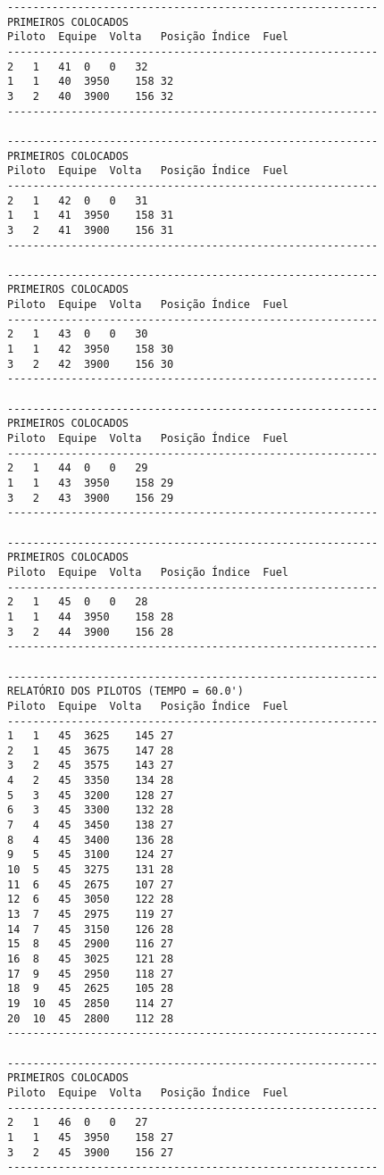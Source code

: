 \documentclass[12pt]{article}
\begin{document}
\begin{verbatim}
----------------------------------------------------------
PRIMEIROS COLOCADOS
Piloto	Equipe	Volta	Posição	Índice	Fuel
----------------------------------------------------------
2	1	41	0	0	32
1	1	40	3950	158	32
3	2	40	3900	156	32
----------------------------------------------------------

----------------------------------------------------------
PRIMEIROS COLOCADOS
Piloto	Equipe	Volta	Posição	Índice	Fuel
----------------------------------------------------------
2	1	42	0	0	31
1	1	41	3950	158	31
3	2	41	3900	156	31
----------------------------------------------------------

----------------------------------------------------------
PRIMEIROS COLOCADOS
Piloto	Equipe	Volta	Posição	Índice	Fuel
----------------------------------------------------------
2	1	43	0	0	30
1	1	42	3950	158	30
3	2	42	3900	156	30
----------------------------------------------------------

----------------------------------------------------------
PRIMEIROS COLOCADOS
Piloto	Equipe	Volta	Posição	Índice	Fuel
----------------------------------------------------------
2	1	44	0	0	29
1	1	43	3950	158	29
3	2	43	3900	156	29
----------------------------------------------------------

----------------------------------------------------------
PRIMEIROS COLOCADOS
Piloto	Equipe	Volta	Posição	Índice	Fuel
----------------------------------------------------------
2	1	45	0	0	28
1	1	44	3950	158	28
3	2	44	3900	156	28
----------------------------------------------------------

----------------------------------------------------------
RELATÓRIO DOS PILOTOS (TEMPO = 60.0')
Piloto	Equipe	Volta	Posição	Índice	Fuel
----------------------------------------------------------
1	1	45	3625	145	27
2	1	45	3675	147	28
3	2	45	3575	143	27
4	2	45	3350	134	28
5	3	45	3200	128	27
6	3	45	3300	132	28
7	4	45	3450	138	27
8	4	45	3400	136	28
9	5	45	3100	124	27
10	5	45	3275	131	28
11	6	45	2675	107	27
12	6	45	3050	122	28
13	7	45	2975	119	27
14	7	45	3150	126	28
15	8	45	2900	116	27
16	8	45	3025	121	28
17	9	45	2950	118	27
18	9	45	2625	105	28
19	10	45	2850	114	27
20	10	45	2800	112	28
----------------------------------------------------------

----------------------------------------------------------
PRIMEIROS COLOCADOS
Piloto	Equipe	Volta	Posição	Índice	Fuel
----------------------------------------------------------
2	1	46	0	0	27
1	1	45	3950	158	27
3	2	45	3900	156	27
----------------------------------------------------------


\end{verbatim}
\end{document}
